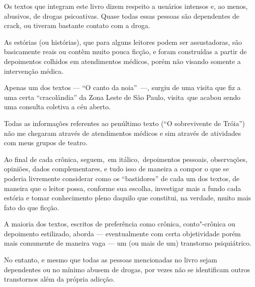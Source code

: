  

Os textos que integram este livro dizem respeito a usuários intensos e,
ao menos, abusivos, de drogas psicoativas. Quase todas essas pessoas são
dependentes de crack, ou tiveram bastante contato com a droga.

As estórias (ou histórias), que para alguns leitores podem ser
assustadoras, são basicamente reais ou contêm muito pouca ficção, e
foram construídas a partir de depoimentos colhidos em atendimentos
médicos, porém não visando somente a intervenção médica.

Apenas um dos textos --- ``O canto da noia''~\mbox{---,} surgiu de uma visita
que fiz a uma certa ``cracolândia'' da Zona Leste de São Paulo,
visita~que acabou sendo uma consulta coletiva a céu aberto.

Todas as informações referentes ao penúltimo texto (``O sobrevivente de
Tróia'') não me chegaram através de atendimentos médicos e sim através
de atividades com meus grupos de teatro.

Ao final de cada crônica, seguem,~em itálico,~depoimentos pessoais,
observações, opiniões, dados complementares, e tudo isso de maneira a
compor o que se poderia livremente considerar como os ``bastidores'' de
cada um dos textos, de maneira que o leitor possa, conforme sua escolha,
investigar mais a fundo cada estória e tomar conhecimento pleno daquilo
que constitui, na verdade, muito mais fato do que ficção.

A maioria dos textos, escritos de preferência como crônica,
conto"-crônica ou depoimento estilizado, aborda --- eventualmente com
certa objetividade porém mais comumente de maneira vaga --- um (ou mais
de um) transtorno psiquiátrico.

No entanto, e mesmo que todas as pessoas mencionadas no livro sejam
dependentes ou no mínimo abusem de drogas, por vezes não se identificam
outros transtornos além da própria adicção.

 
